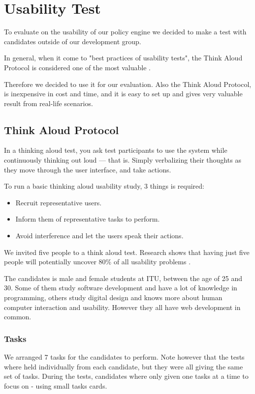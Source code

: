 \section{Usability Test}
\label{sec:usability-test}
To evaluate on the usability of our policy engine we decided to make a test with candidates outside of our development group.

In general, when it come to "best practices of usability tests", the Think Aloud Protocol is considered one of the most valuable \cite{Nielsen1993}.

Therefore we decided to use it for our evaluation. Also the Think Aloud Protocol, is inexpensive in cost and time, and it is easy to set up and gives very valuable result from real-life scenarios. 

\subsection{Think Aloud Protocol}
In a thinking aloud test, you ask test participants to use the system while continuously thinking out loud — that is. Simply verbalizing their thoughts as they move through the user interface, and take actions.

To run a basic thinking aloud usability study, 3 things is required:
\begin{itemize}
\item Recruit representative users.
\item Inform them of representative tasks to perform. %
\item Avoid interference and let the users speak their actions.
\end{itemize}

We invited five people to a think aloud test. Research shows that having just five people will potentially uncover 80\% of all usability problems \cite{jakobnielsen2000fiveusers}.

The candidates is male and female students at ITU, between the age of 25 and 30. Some of them study software development and have a lot of knowledge in programming, others study digital design and knows more about human computer interaction and usability. However they all have web development in common.

\subsubsection{Tasks}
We arranged 7 tasks for the candidates to perform.  Note however that the tests where held individually from each candidate, but they were all giving the same set of tasks. 
During the tests, candidates where only given one tasks at a time to focus on - using small tasks cards.

